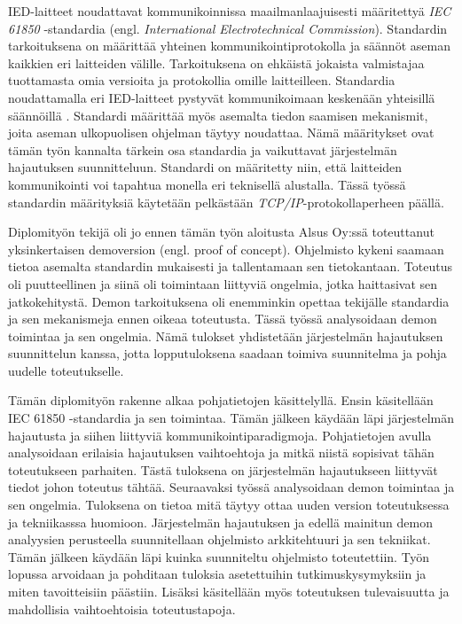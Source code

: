 IED-laitteet noudattavat kommunikoinnissa maailmanlaajuisesti määritettyä \emph{IEC 61850} -standardia (engl. \emph{International Electrotechnical Commission}). Standardin tarkoituksena on määrittää yhteinen kommunikointiprotokolla ja säännöt aseman kaikkien eri laitteiden välille. Tarkoituksena on ehkäistä jokaista valmistajaa tuottamasta omia versioita ja protokollia omille laitteilleen. Standardia noudattamalla eri IED-laitteet pystyvät kommunikoimaan keskenään yhteisillä säännöillä \cite[s.~624]{Mackiewicz2006}. Standardi määrittää myös asemalta tiedon saamisen mekanismit, joita aseman ulkopuolisen ohjelman täytyy noudattaa. Nämä määritykset ovat tämän työn kannalta tärkein osa standardia ja vaikuttavat järjestelmän hajautuksen suunnitteluun. Standardi on määritetty niin, että laitteiden kommunikointi voi tapahtua monella eri teknisellä alustalla. Tässä työssä standardin määrityksiä käytetään pelkästään \emph{TCP/IP}-protokollaperheen päällä.

Diplomityön tekijä oli jo ennen tämän työn aloitusta Alsus Oy:ssä toteuttanut yksinkertaisen demoversion (engl. proof of concept). Ohjelmisto kykeni saamaan tietoa asemalta standardin mukaisesti ja tallentamaan sen tietokantaan. Toteutus oli puutteellinen ja siinä oli toimintaan liittyviä ongelmia, jotka haittasivat sen jatkokehitystä. Demon tarkoituksena oli enemminkin opettaa tekijälle standardia ja sen mekanismeja ennen oikeaa toteutusta. Tässä työssä analysoidaan demon toimintaa ja sen ongelmia. Nämä tulokset yhdistetään järjestelmän hajautuksen suunnittelun kanssa, jotta lopputuloksena saadaan toimiva suunnitelma ja pohja uudelle toteutukselle.

Tämän diplomityön rakenne alkaa pohjatietojen käsittelyllä. Ensin käsitellään IEC 61850 -standardia ja sen toimintaa. Tämän jälkeen käydään läpi järjestelmän hajautusta ja siihen liittyviä kommunikointiparadigmoja. Pohjatietojen avulla analysoidaan erilaisia hajautuksen vaihtoehtoja ja mitkä niistä sopisivat tähän toteutukseen parhaiten. Tästä tuloksena on järjestelmän hajautukseen liittyvät tiedot johon toteutus tähtää. Seuraavaksi työssä analysoidaan demon toimintaa ja sen ongelmia. Tuloksena on tietoa mitä täytyy ottaa uuden version toteutuksessa ja tekniikasssa huomioon. Järjestelmän hajautuksen ja edellä mainitun demon analyysien perusteella suunnitellaan ohjelmisto arkkitehtuuri ja sen tekniikat. Tämän jälkeen käydään läpi kuinka suunniteltu ohjelmisto toteutettiin. Työn lopussa arvoidaan ja pohditaan tuloksia asetettuihin tutkimuskysymyksiin ja miten tavoitteisiin päästiin. Lisäksi käsitellään myös toteutuksen tulevaisuutta ja mahdollisia vaihtoehtoisia toteutustapoja.

